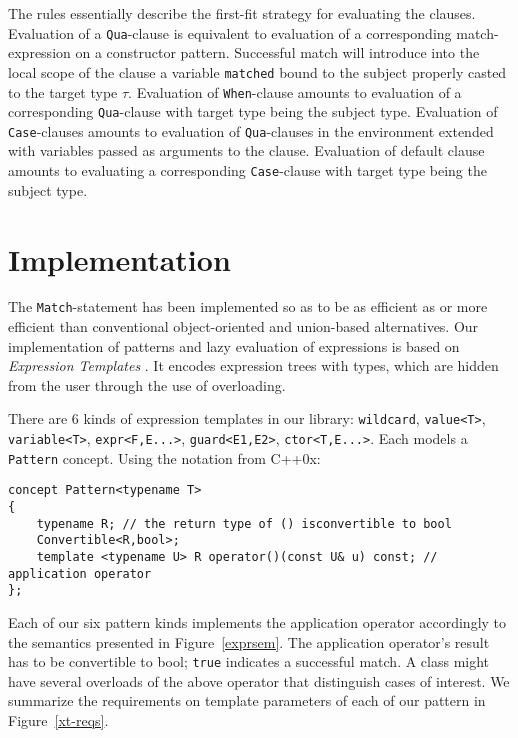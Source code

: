 \documentclass{llncs}
\makeatletter
\DeclareRobustCommand{\code}[1]{{\lstinline[keepspaces,breaklines=false,escapechar=@]{#1}}}
\makeatother
\begin{document}
The rules essentially describe the first-fit strategy for evaluating the clauses.
Evaluation of a \code{Qua}-clause is equivalent to evaluation of a corresponding 
match-expression on a constructor pattern. Successful match will introduce into 
the local scope of the clause a variable \code{matched} bound to the subject 
properly casted to the target type $\tau$. Evaluation of \code{When}-clause 
amounts to evaluation of a corresponding \code{Qua}-clause with target type 
being the subject type. Evaluation of \code{Case}-clauses amounts to evaluation 
of \code{Qua}-clauses in the environment extended with variables passed as 
arguments to the clause. Evaluation of default clause amounts to evaluating a 
corresponding \code{Case}-clause with target type being the subject type.

\section{Implementation} %
\label{sec:impl}

The \code{Match}-statement has been implemented so as to be as efficient as or 
more efficient than conventional object-oriented and union-based 
alternatives\cite{TypeSwitch}. Our implementation of patterns and lazy 
evaluation of expressions is based on \emph{Expression Templates} 
\cite{Veldhuizen95expressiontemplates,vandevoorde2003c++}. It encodes 
expression trees with types, which are hidden from the user through the use of 
overloading.

There are 6 kinds of expression templates in our library: \code{wildcard}, 
\code{value<T>}, \code{variable<T>}, \code{expr<F,E...>}, \code{guard<E1,E2>}, 
\code{ctor<T,E...>}. Each models a \code{Pattern} concept.
Using the notation from C++0x\cite{C++0xConcepts}:

\begin{lstlisting}[keepspaces,columns=flexible]
concept Pattern<typename T> 
{
    typename R; // the return type of () isconvertible to bool
    Convertible<R,bool>;
    template <typename U> R operator()(const U& u) const; // application operator
};
\end{lstlisting}

Each of our six pattern kinds 
implements the application operator accordingly to the semantics presented in 
Figure~\ref{exprsem}. The application operator's result has to be 
convertible to bool;
\code{true} indicates a successful match. A class might have several overloads of 
the above operator that distinguish cases of interest. We summarize the requirements on template parameters of each of our 
pattern in Figure~\ref{xt-reqs}.
\end{document}
